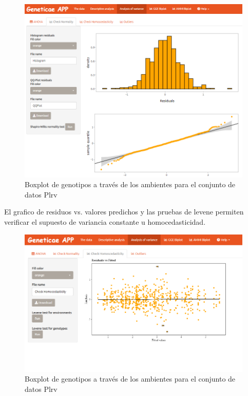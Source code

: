 \begin{figure}[H]
	\begin{center}
		\includegraphics[width=17cm]{./Graficos/Normalidad.png}
	\end{center}
	\caption{Boxplot de genotipos a través de los ambientes para el conjunto de datos Plrv}
	\label{fig:fig49}
\end{figure}

El grafico de residuos vs. valores predichos y las pruebas de levene permiten verificar el supuesto de variancia constante u homocedasticidad.

\begin{figure}[H]
	\begin{center}
		\includegraphics[width=17cm]{./Graficos/Homocedasticidad.png}
	\end{center}
	\caption{Boxplot de genotipos a través de los ambientes para el conjunto de datos Plrv}
	\label{fig:fig49}
\end{figure}

